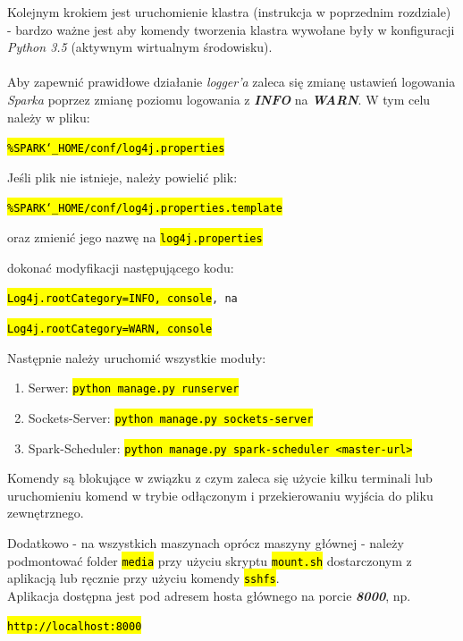 \documentclass[a4paper,onecolumn,oneside,12pt]{memoir}
\begin{document}
{{Kolejnym krokiem jest uruchomienie klastra (instrukcja w poprzednim rozdziale) - bardzo ważne jest aby komendy
tworzenia klastra wywołane były w konfiguracji \textit{Python 3.5} (aktywnym wirtualnym
środowisku).
\\
\\
Aby zapewnić prawidłowe działanie \textit{logger’a} zaleca się zmianę ustawień logowania \textit{Sparka} poprzez zmianę poziomu logowania z \textit{\textbf{INFO}} na \textit{\textbf{WARN}}. W tym celu należy w pliku:\vspace{2mm}
 \centerline{\texttt{\hl{\%SPARK{\char`_}HOME/conf/log4j.properties}}}
\begin{framed}
Jeśli plik nie istnieje, należy powielić plik:\\ \vspace{2mm}
  \centerline{\texttt{\hl{\%SPARK{\char`_}HOME/conf/log4j.properties.template}}}

oraz zmienić jego nazwę na \texttt{\hl{log4j.properties}} 
\end{framed}
dokonać modyfikacji  następującego kodu: \\ \vspace{2mm}
  \centerline{\texttt{\hl{Log4j.rootCategory=INFO, console}, na}}
  \centerline{\texttt{\hl{Log4j.rootCategory=WARN, console}}}\vspace{2mm}

Następnie należy uruchomić wszystkie moduły:
\begin{enumerate}
\item Serwer: \texttt{\hl{python manage.py runserver}}
\item Sockets-Server: \texttt{\hl{python manage.py sockets-server}}
\item Spark-Scheduler: \texttt{\hl{python manage.py spark-scheduler <master-url>}}
\end{enumerate}

Komendy są blokujące w związku z czym zaleca się użycie kilku terminali lub uruchomieniu
komend w trybie odłączonym i przekierowaniu wyjścia do pliku zewnętrznego.\vspace{2mm}

Dodatkowo - na wszystkich maszynach oprócz maszyny głównej - należy podmontować folder
\texttt{\hl{media}} przy użyciu skryptu \texttt{\hl{mount.sh}} dostarczonym z aplikacją lub ręcznie przy użyciu
komendy \texttt{\hl{sshfs}}.\\
\vspace{2mm} Aplikacja dostępna jest pod adresem hosta głównego na porcie \textbf{\textit{8000}}, np.\\
\centerline{\texttt{\hl{http://localhost:8000}}}
}}
\end{document}
